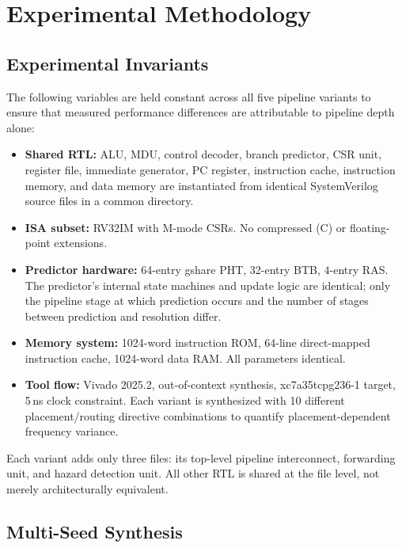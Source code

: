 \documentclass[journal]{IEEEtran}
\begin{document}
\begin{table}[t]
\begin{table}[t]
\section{Experimental Methodology}
\label{sec:methodology}

\subsection{Experimental Invariants}
\label{sec:invariants}

The following variables are held constant across all five pipeline variants to ensure that measured performance differences are attributable to pipeline depth alone:
\begin{itemize}
\item \textbf{Shared RTL:} ALU, MDU, control decoder, branch predictor, CSR unit, register file, immediate generator, PC register, instruction cache, instruction memory, and data memory are instantiated from identical SystemVerilog source files in a common directory.
\item \textbf{ISA subset:} RV32IM with M-mode CSRs. No compressed (C) or floating-point extensions.
\item \textbf{Predictor hardware:} 64-entry gshare PHT, 32-entry BTB, 4-entry RAS. The predictor's internal state machines and update logic are identical; only the pipeline stage at which prediction occurs and the number of stages between prediction and resolution differ.
\item \textbf{Memory system:} 1024-word instruction ROM, 64-line direct-mapped instruction cache, 1024-word data RAM. All parameters identical.
\item \textbf{Tool flow:} Vivado 2025.2, out-of-context synthesis, xc7a35tcpg236-1 target, 5\,ns clock constraint. Each variant is synthesized with 10 different placement/routing directive combinations to quantify placement-dependent frequency variance.
\end{itemize}
Each variant adds only three files: its top-level pipeline interconnect, forwarding unit, and hazard detection unit. All other RTL is shared at the file level, not merely architecturally equivalent.

\subsection{Multi-Seed Synthesis}


\end{table}
\end{table}
\end{document}
